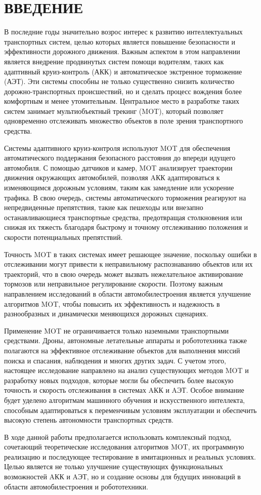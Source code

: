 \chapter*{ВВЕДЕНИЕ}

В последние годы значительно возрос интерес к развитию интеллектуальных транспортных систем, целью которых является повышение безопасности и эффективности дорожного движения. Важным аспектом в этом направлении является внедрение продвинутых систем помощи водителям, таких как адаптивный круиз-контроль (АКК) и автоматическое экстренное торможение (АЭТ). Эти системы способны не только существенно снизить количество дорожно-транспортных происшествий, но и сделать процесс вождения более комфортным и менее утомительным. Центральное место в разработке таких систем занимает мультиобъектный трекинг (MOT), который позволяет одновременно отслеживать множество объектов в поле зрения транспортного средства.

Системы адаптивного круиз-контроля используют MOT для обеспечения автоматического поддержания безопасного расстояния до впереди идущего автомобиля. С помощью датчиков и камер, MOT анализирует траектории движения окружающих автомобилей, позволяя AКК адаптироваться к изменяющимся дорожным условиям, таким как замедление или ускорение трафика. В свою очередь, системы автоматического торможения реагируют на непредвиденные препятствия, такие как пешеходы или внезапно останавливающиеся транспортные средства, предотвращая столкновения или снижая их тяжесть благодаря быстрому и точному отслеживанию положения и скорости потенциальных препятствий.

Точность MOT в таких системах имеет решающее значение, поскольку ошибки в отслеживании могут привести к неправильному распознаванию объектов или их траекторий, что в свою очередь может вызвать нежелательное активирование тормозов или неправильное регулирование скорости. Поэтому важным направлением исследований в области автомобилестроения является улучшение алгоритмов MOT, чтобы повысить их эффективность и надежность в разнообразных и динамически меняющихся дорожных сценариях.

Применение MOT не ограничивается только наземными транспортными средствами. Дроны, автономные летательные аппараты и робототехника также полагаются на эффективное отслеживание объектов для выполнения миссий поиска и спасания, наблюдения и многих других задач. С учетом этого, настоящее исследование направлено на анализ существующих методов MOT и разработку новых подходов, которые могли бы обеспечить более высокую точность и скорость отслеживания в системах AКК и AЭТ. Особое внимание будет уделено алгоритмам машинного обучения и искусственного интеллекта, способным адаптироваться к переменчивым условиям эксплуатации и обеспечить высокую степень автономности транспортных средств.

В ходе данной работы предполагается использовать комплексный подход, сочетающий теоретические исследования алгоритмов MOT, их программную реализацию и последующее тестирование в имитационных и реальных условиях. Целью является не только улучшение существующих функциональных возможностей AКК и AЭТ, но и создание основы для будущих инноваций в области автомобилестроения и {робототехники}.

